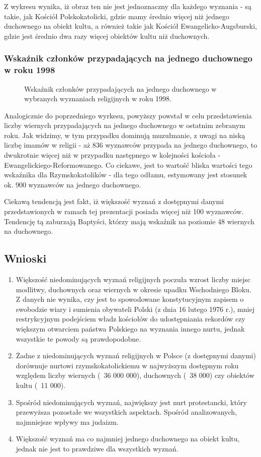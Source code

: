 \documentclass[12pt]{article}
\begin{document}
Z wykresu wynika, iż obraz ten nie jest jednoznaczny dla każdego wyznania - są takie, jak Kościół Polskokatolicki, gdzie mamy średnio więcej niż jednego duchownego na obiekt kultu, a również takie jak
Kościół Ewangelicko-Augsburski, gdzie jest średnio dwa razy więcej obiektów kultu niż duchownych.  


\subsubsection{Wskaźnik członków przypadających na jednego duchownego w roku 1998}
\begin{figure}[H]
    
    \caption{Wskaźnik członków przypadających na jednego duchownego w wybranych wyznaniach religijnych w roku 1998.}
\end{figure}

Analogicznie do poprzedniego wyrkesu, powyższy powstał w celu przedstawienia liczby wiernych przypadających na jednego duchownego w ostatnim zebranym roku. 
Jak widzimy, w tym przypadku dominują muzułmanie, z uwagi na niską liczbę imamów w religii - aż 836 wyznawców przypada na jednego duchownego, to dwukrotnie więcej niż w przypadku następnego w kolejności kościoła -
Ewangelickiego-Reformowanego. Co ciekawe, jest to wartość bliska wartości tego wskaźnika dla Rzymskokatolików - dla tego odłamu, estymowany jest stosunek ok. 900 wyznawców na jednego duchownego.

Ciekawą tendencją jest fakt, iż większość wyznań z dostępnymi danymi przedstawionych w ramach tej prezentacji posiada więcej niż 100 wyznawców. Tendencję tą zaburzają Baptyści, którzy mają wskaźnik na poziomie
48 wiernych na duchownego.


\subsection{Wnioski}
\begin{enumerate}
    \item Większość niedominujących wyznań religijnych poczuła wzrost liczby miejsc modlitwy, duchownych oraz wiernych w okresie upadku Wschodniego Bloku. 
            Z danych nie wynika, czy jest to spowodowane konstytucyjnym zapisem o swobodzie wiary i sumienia obywateli Polski (z dnia 16 lutego 1976 r.),
            mniej restrykcyjnym podejściem władz kościołów do udostępniania rekordów czy większym otwarciem państwa Polskiego na wyznania innego nurtu,
            jednak wszystkie te powody są prawdopodobne.  
    \item Żadne z niedominujących wyznań religijnych w Polsce (z dostępnymi danymi) dorównuje nurtowi rzymskokatolickiemu w najwyższym dostępnym roku względem 
            liczby wiernych (~36 000 000), duchownych (~38 000) czy obiektów kultu (~11 000).
    \item Spośród niedominujących wyznań, największy jest nurt protestancki, który przewyższa pozostałe we wszystkich aspektach. Spośród analizowanych, najmniejsze wpływy ma judaizm.
    \item Większość wyznań ma co najmniej jednego duchownego na obiekt kultu, jednak nie jest to prawdziwe dla wszystkich wyznań.
\end{enumerate}
\end{document}
